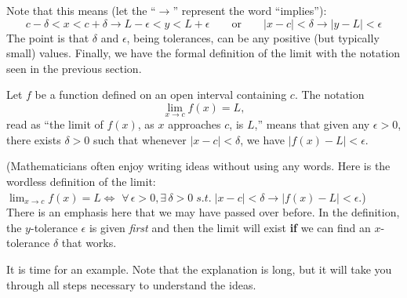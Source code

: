 Note that this means (let the ``$\longrightarrow$'' represent the word ``implies''):
$$
c - \delta < x < c + \delta \longrightarrow L - \epsilon < y < L + \epsilon 
\qquad \textrm{or} \qquad
|x - c| < \delta \longrightarrow  |y - L| < \epsilon 
$$
The point is that $\delta$ and $\epsilon$, being tolerances, can be any positive (but typically small) values.  Finally, we have the formal definition of the limit with the notation  seen in the previous section.

{Let $f$ be a function defined on an open interval containing $c$. The notation $$\displaystyle \lim_{x\rightarrow c} f(x) = L,$$ read as ``the limit of $f(x)$, as $x$ approaches $c$, is $L$,'' 
means that given any $\epsilon > 0$, there exists $\delta > 0$ such that 
whenever $|x - c| < \delta$, we have $|f(x) - L| < \epsilon$.
}

(Mathematicians often enjoy writing ideas without using any words. Here is the wordless definition of the limit:\\

$\displaystyle \lim_{x\rightarrow c} f(x) = L \iff$
$\forall \, \epsilon > 0, \exists \, \delta > 0 \; s.t. \;
|x - c| < \delta \longrightarrow |f(x) - L| < \epsilon$.)\\

There is an emphasis here that we may have passed over before.  In the definition, the $y$-tolerance $\epsilon$ is given \textit{first} and then the limit will exist {\bf if} we can find an $x$-tolerance $\delta$ that works.  

It is time for an example.  Note that the explanation is long, but it will take you through all steps necessary to understand the ideas.\\

